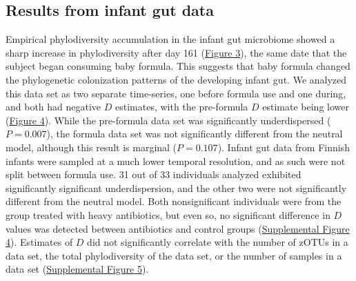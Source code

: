 \documentclass{article}
\begin{document}
\subsection{Results from infant gut data}
Empirical phylodiversity accumulation in the infant gut microbiome \cite{Koenig2011} showed a sharp increase in phylodiversity after day 161 (\hyperref[sec:figure3]{Figure 3}), the same date that the subject began consuming baby formula. This suggests that baby formula changed the phylogenetic colonization patterns of the developing infant gut. We analyzed this data set as two separate time-series, one before formula use and one during, and both had negative \(D\) estimates, with the pre-formula \(D\) estimate being lower (\hyperref[sec:figure4]{Figure 4}). While the pre-formula data set was significantly underdispersed (\(P = 0.007\)), the formula data set was not significantly different from the neutral model, although this result is marginal (\(P = 0.107\)). Infant gut data from Finnish infants \cite{Yassour2016} were sampled at a much lower temporal resolution, and as such were not split between formula use. 31 out of 33 individuals analyzed exhibited significantly significant underdispersion, and the other two were not significantly different from the neutral model. Both nonsignificant individuals were from the group treated with heavy antibiotics, but even so, no significant difference in \(D\) values was detected between antibiotics and control groups (\hyperref[sec:figureS4]{Supplemental Figure 4}). Estimates of \(D\) did not significantly correlate with the number of zOTUs in a data set, the total phylodiversity of the data set, or the number of samples in a data set (\hyperref[sec:figureS5]{Supplemental Figure 5}). 


\end{document}
